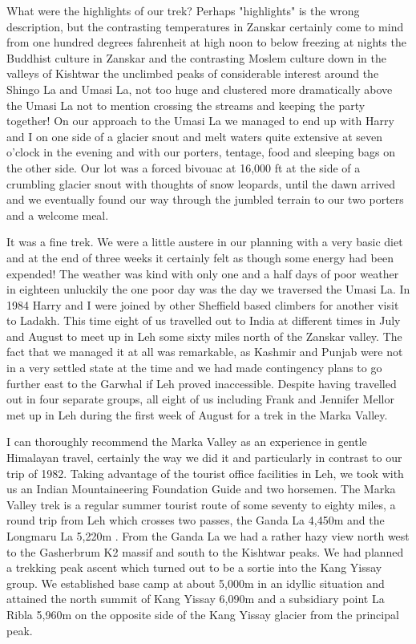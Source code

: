 \documentclass[a5paper,openany,font 10pt]{scrbook}
\begin{document}
What were the highlights of our trek? Perhaps "highlights"
is the wrong description, but the contrasting temperatures in
Zanskar certainly come to mind   from one hundred degrees
fahrenheit at high noon to below freezing at nights  the Buddhist
culture in Zanskar and the contrasting Moslem culture down in the
valleys of Kishtwar  the unclimbed peaks of considerable interest
around the Shingo La and Umasi La, not too huge and clustered
more dramatically above the Umasi La  not to mention crossing the
streams and keeping the party together! On our approach to the
Umasi La we managed to end up with Harry and I on one side of a
glacier snout and melt waters  quite extensive at seven o'clock
in the evening  and with our porters, tentage, food and sleeping
bags on the other side. Our lot was a forced bivouac at 16,000 ft
at the side of a crumbling glacier snout with thoughts of snow
leopards, until the dawn arrived and we eventually found our way
through the jumbled terrain to our two porters and a welcome
meal.

It was a fine trek. We were a little austere in our planning
with a very basic diet and at the end of three weeks it certainly
felt as though some energy had been expended! The weather was
kind with only one and a half days of poor weather in eighteen
unluckily the one poor day was the day we traversed the Umasi La.
In 1984 Harry and I were joined by other Sheffield based
climbers for another visit to Ladakh. This time eight of us
travelled out to India at different times in July and August to
meet up in Leh some sixty miles north of the Zanskar valley. The
fact that we managed it at all was remarkable, as Kashmir and
Punjab were not in a very settled state at the time and we had
made contingency plans to go further east to the Garwhal if Leh
proved inaccessible. Despite having travelled out in four
separate groups, all eight of us  including Frank and Jennifer
Mellor  met up in Leh during the first week of August for a trek
in the Marka Valley.

I can thoroughly recommend the Marka Valley as an experience
in gentle Himalayan travel, certainly the way we did it and
particularly in contrast to our trip of 1982. Taking advantage of
the tourist office facilities in Leh, we took with us an Indian
Mountaineering Foundation Guide and two horsemen. The Marka
Valley trek is a regular summer tourist route of some seventy to
eighty miles, a round trip from Leh which crosses two passes, the
Ganda La  4,450m  and the Longmaru La  5,220m . From the Ganda La
we had a rather hazy view north west to the Gasherbrum K2 massif
and south to the Kishtwar peaks. We had planned a trekking peak
ascent which turned out to be a sortie into the Kang Yissay
group. We established base camp at about 5,000m in an idyllic
situation and attained the north summit of Kang Yissay  6,090m
and a subsidiary point La Ribla  5,960m  on the opposite side of
the Kang Yissay glacier from the principal peak.
\end{document}
